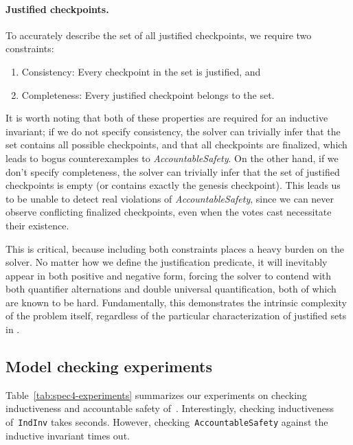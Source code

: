\paragraph{Justified checkpoints.} To accurately describe the set of all justified checkpoints, we require two constraints:
\begin{enumerate}
	\item Consistency: Every checkpoint in the set is justified, and 
	\item Completeness: Every justified checkpoint belongs to the set.
\end{enumerate}
It is worth noting that both of these properties are required for an inductive invariant; if we do not specify consistency, the solver can trivially infer that the set contains all possible checkpoints, and that all checkpoints are finalized, which leads to bogus counterexamples to \textit{AccountableSafety}.
On the other hand, if we don't specify completeness, the solver can trivially infer that the set of justified checkpoints is empty (or contains exactly the genesis checkpoint). This leads us to be unable to detect real violations of \textit{AccountableSafety}, since we can never observe conflicting finalized checkpoints, even when the votes cast necessitate their existence.

This is critical, because including both constraints places a heavy burden on the solver. No matter how we define the justification predicate, it will inevitably appear in both positive and negative form, forcing the solver to contend with both quantifier alternations and double universal quantification, both of which are known to be hard.
Fundamentally, this demonstrates the intrinsic complexity of the problem itself, regardless of the particular characterization of justified sets in \tlap{}.

\subsection{Model checking experiments}

Table~\ref{tab:spec4-experiments} summarizes our experiments on checking
inductiveness and accountable safety of~\SpecFourB{}. Interestingly, checking
inductiveness of~\texttt{IndInv} takes seconds. However,
checking~\texttt{AccountableSafety} against the inductive invariant times out.

